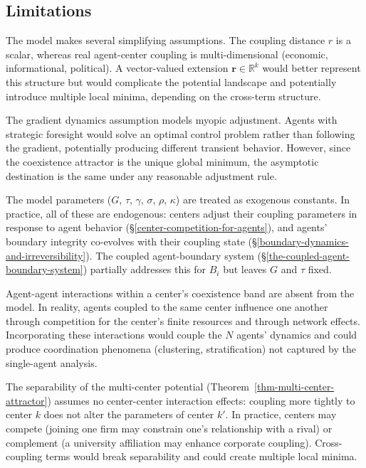 \documentclass[11pt]{article}
\theoremstyle{plain}
\theoremstyle{definition}
\theoremstyle{remark}
\let\origsubsection\subsection
\renewcommand{\subsection}{\needspace{7\baselineskip}\origsubsection}
\begin{document}
\subsection{Limitations}\label{limitations}

The model makes several simplifying assumptions. The coupling distance
\(r\) is a scalar, whereas real agent-center coupling is
multi-dimensional (economic, informational, political). A vector-valued
extension \(\mathbf{r} \in \mathbb{R}^k\) would better represent this
structure but would complicate the potential landscape and potentially
introduce multiple local minima, depending on the cross-term structure.

The gradient dynamics assumption models myopic adjustment. Agents with
strategic foresight would solve an optimal control problem rather than
following the gradient, potentially producing different transient
behavior. However, since the coexistence attractor is the unique global
minimum, the asymptotic destination is the same under any reasonable
adjustment rule.

The model parameters (\(G\), \(\tau\), \(\gamma\), \(\sigma\), \(\rho\),
\(\kappa\)) are treated as exogenous constants. In practice, all of
these are endogenous: centers adjust their coupling parameters in
response to agent behavior (§\ref{center-competition-for-agents}), and
agents' boundary integrity co-evolves with their coupling state
(§\ref{boundary-dynamics-and-irreversibility}). The coupled
agent-boundary system (§\ref{the-coupled-agent-boundary-system})
partially addresses this for \(B_i\) but leaves \(G\) and \(\tau\)
fixed.

Agent-agent interactions within a center's coexistence band are absent
from the model. In reality, agents coupled to the same center influence
one another through competition for the center's finite resources and
through network effects. Incorporating these interactions would couple
the \(N\) agents' dynamics and could produce coordination phenomena
(clustering, stratification) not captured by the single-agent analysis.

The separability of the multi-center potential
(Theorem~\ref{thm-multi-center-attractor}) assumes no center-center
interaction effects: coupling more tightly to center \(k\) does not
alter the parameters of center \(k'\). In practice, centers may compete
(joining one firm may constrain one's relationship with a rival) or
complement (a university affiliation may enhance corporate coupling).
Cross-coupling terms would break separability and could create multiple
local minima.
\end{document}
